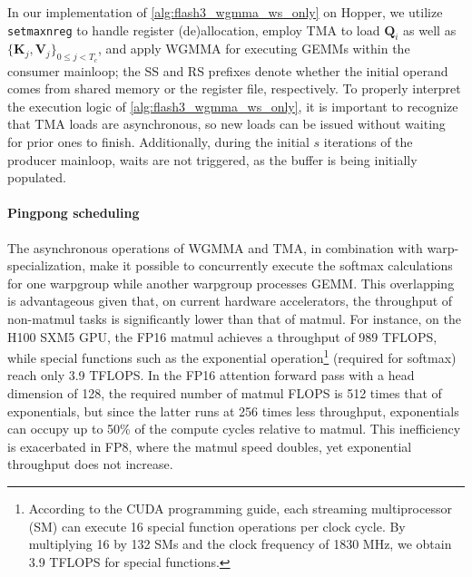 In our implementation of \cref{alg:flash3_wgmma_ws_only} on Hopper, we utilize \verb|setmaxnreg| to handle register (de)allocation, employ TMA to load $\mathbf{Q}_i$ as well as $\{\mathbf{K}_j, \mathbf{V}_j\}_{0 \leq j < T_c}$, and apply WGMMA for executing GEMMs within the consumer mainloop; the SS and RS prefixes denote whether the initial operand comes from shared memory or the register file, respectively. To properly interpret the execution logic of \cref{alg:flash3_wgmma_ws_only}, it is important to recognize that TMA loads are asynchronous, so new loads can be issued without waiting for prior ones to finish. Additionally, during the initial $s$ iterations of the producer mainloop, waits are not triggered, as the buffer is being initially populated.

\paragraph{Pingpong scheduling} The asynchronous operations of WGMMA and TMA, in combination with warp-specialization, make it possible to concurrently execute the softmax calculations for one warpgroup while another warpgroup processes GEMM. This overlapping is advantageous given that, on current hardware accelerators, the throughput of non-matmul tasks is significantly lower than that of matmul. For instance, on the H100 SXM5 GPU, the FP16 matmul achieves a throughput of 989 TFLOPS, while special functions such as the exponential operation\footnote{According to the CUDA programming guide, each streaming multiprocessor (SM) can execute 16 special function operations per clock cycle. By multiplying 16 by 132 SMs and the clock frequency of 1830 MHz, we obtain 3.9 TFLOPS for special functions.} (required for softmax) reach only 3.9 TFLOPS. In the FP16 attention forward pass with a head dimension of 128, the required number of matmul FLOPS is 512 times that of exponentials, but since the latter runs at 256 times less throughput, exponentials can occupy up to 50\% of the compute cycles relative to matmul. This inefficiency is exacerbated in FP8, where the matmul speed doubles, yet exponential throughput does not increase.

